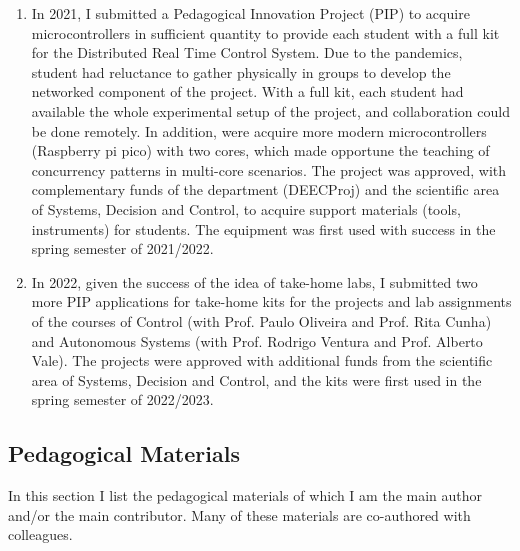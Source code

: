 \documentclass[
]{article}
\begin{document}
\begin{enumerate}
  widely used in industry, the introduction of these modules improves
  the practical relevance of the course project.
\item
  In 2021, I submitted a Pedagogical Innovation Project (PIP) to acquire
  microcontrollers in sufficient quantity to provide each student with a
  full kit for the Distributed Real Time Control System. Due to the
  pandemics, student had reluctance to gather physically in groups to
  develop the networked component of the project. With a full kit, each
  student had available the whole experimental setup of the project, and
  collaboration could be done remotely. In addition, were acquire more
  modern microcontrollers (Raspberry pi pico) with two cores, which made
  opportune the teaching of concurrency patterns in multi-core
  scenarios. The project was approved, with complementary funds of the
  department (DEECProj) and the scientific area of Systems, Decision and
  Control, to acquire support materials (tools, instruments) for
  students. The equipment was first used with success in the spring
  semester of 2021/2022.
\item
  In 2022, given the success of the idea of take-home labs, I submitted
  two more PIP applications for take-home kits for the projects and lab
  assignments of the courses of Control (with Prof. Paulo Oliveira and
  Prof. Rita Cunha) and Autonomous Systems (with Prof. Rodrigo Ventura
  and Prof. Alberto Vale). The projects were approved with additional
  funds from the scientific area of Systems, Decision and Control, and
  the kits were first used in the spring semester of 2022/2023.
\end{enumerate}

\subsection{Pedagogical Materials}\label{pedagogical-materials}

In this section I list the pedagogical materials of which I am the main
author and/or the main contributor. Many of these materials are
co-authored with colleagues.
\end{document}
